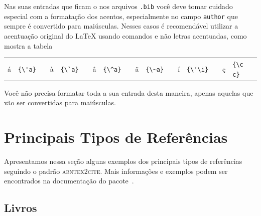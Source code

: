 \documentclass[fleqn]{icat-ufal}
\begin{document}
Nas suas entradas que ficam o nos arquivos \texttt{.bib} 
você deve tomar cuidado especial com a formatação dos acentos, 
especialmente no campo \texttt{author} que sempre é convertido para maiúsculas. 
Nesses casos é recomendável utilizar a acentuação original do \LaTeX 
usando comandos e não letras acentuadas, como mostra a tabela
\begin{center}
    \begin{tabular}{clcclcclcclcclccl}
            á & \lstinline!{\'a}!  & & 
            à & \lstinline!{\`a}!  & & 
            â & \lstinline!{\^a}!  & & 
            ã & \lstinline!{\~a}!  & & 
            í & \lstinline!{\'\i}! & & 
            ç & \lstinline!{\c c}!
    \end{tabular}
\end{center}
Você não precisa formatar toda a sua entrada desta maneira, 
apenas aquelas que vão ser convertidas para maiúsculas.

\section{Principais Tipos de Referências}
\label{sec:principais_tipos_de_referencias}

\newcommand{\citeexample}[1]{
  \begin{flushleft}
    \vspace{-\baselineskip}Entrada produzida na bibliografia
  \end{flushleft}
  \begin{center}
    \begin{small}
    \begin{spacing}{1}
      \fbox{\parbox{0.88\linewidth}{
      \hypersetup{citecolor=black}
      \citetext{#1}
      \hypersetup{citecolor=green}
      \vspace{0.2\baselineskip}}}
    \end{spacing}
    \end{small}
  \end{center}
}

Apresentamos nessa seção alguns exemplos dos principais tipos de referências 
seguindo o padrão \textsc{abntex2cite}. Mais informações e exemplos podem 
ser encontrados na documentação do pacote~\cite{ARAUJO:ABNTEX2CITE}.

\subsection{Livros}
\end{document}
